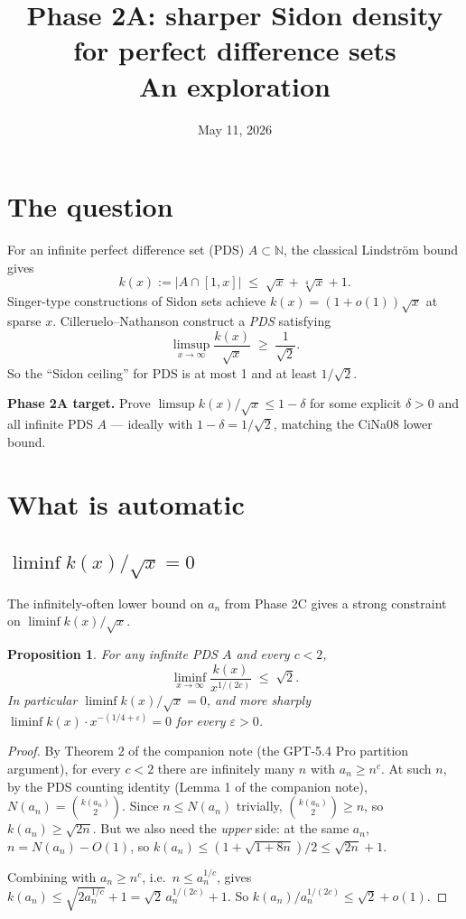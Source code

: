 \documentclass[11pt]{article}
\title{Phase 2A: sharper Sidon density for perfect difference sets \\
  \large An exploration}
\author{}
\date{May 11, 2026}
\newtheorem{proposition}{Proposition}
\begin{document}
\maketitle

\section{The question}

For an infinite perfect difference set (PDS) $A \subset \mathbb{N}$, the
classical Lindstr\"om bound gives
\begin{equation}\label{eq:lind}
   k(x) := |A \cap [1, x]| \;\leq\; \sqrt{x} + \sqrt[4]{x} + 1.
\end{equation}
Singer-type constructions of Sidon sets achieve $k(x) = (1 + o(1)) \sqrt x$
at sparse $x$. Cilleruelo--Nathanson \cite{CiNa08} construct a \emph{PDS}
satisfying
\begin{equation}\label{eq:CN}
   \limsup_{x \to \infty} \frac{k(x)}{\sqrt{x}} \;\geq\; \frac{1}{\sqrt 2}.
\end{equation}
So the ``Sidon ceiling'' for PDS is at most 1 and at least $1/\sqrt 2$.

\textbf{Phase 2A target.} Prove $\limsup k(x)/\sqrt x \leq 1 - \delta$ for
some explicit $\delta > 0$ and all infinite PDS $A$ --- ideally with
$1 - \delta = 1/\sqrt 2$, matching the CiNa08 lower bound.

\section{What is automatic}

\subsection{$\liminf k(x)/\sqrt x = 0$}

The infinitely-often lower bound on $a_n$ from Phase 2C gives a strong
constraint on $\liminf k(x)/\sqrt x$.

\begin{proposition}\label{prop:liminf}
For any infinite PDS $A$ and every $c < 2$,
\[
   \liminf_{x \to \infty} \frac{k(x)}{x^{1/(2c)}} \;\leq\; \sqrt 2.
\]
In particular $\liminf k(x)/\sqrt x = 0$, and more sharply
$\liminf k(x) \cdot x^{-(1/4 + \varepsilon)} = 0$ for every
$\varepsilon > 0$.
\end{proposition}

\begin{proof}
By Theorem 2 of the companion note (the GPT-5.4 Pro partition argument),
for every $c < 2$ there are infinitely many $n$ with $a_n \geq n^c$.
At such $n$, by the PDS counting identity (Lemma 1 of the companion note),
$N(a_n) = \binom{k(a_n)}{2}$. Since $n \leq N(a_n)$ trivially,
$\binom{k(a_n)}{2} \geq n$, so $k(a_n) \geq \sqrt{2n}$. But we also need
the \emph{upper} side: at the same $a_n$, $n = N(a_n) - O(1)$, so
$k(a_n) \leq (1 + \sqrt{1 + 8n})/2 \leq \sqrt{2n} + 1$.

Combining with $a_n \geq n^c$, i.e.\ $n \leq a_n^{1/c}$, gives
$k(a_n) \leq \sqrt{2 a_n^{1/c}} + 1 = \sqrt 2\, a_n^{1/(2c)} + 1$.
So $k(a_n)/a_n^{1/(2c)} \leq \sqrt 2 + o(1)$.
\end{proof}
\end{document}
